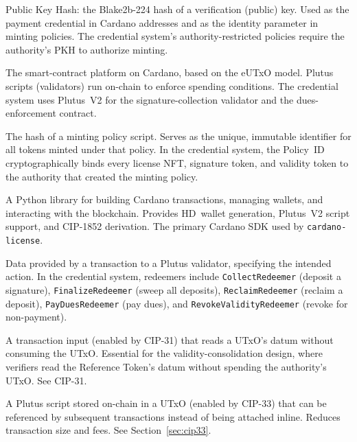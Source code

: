 \begin{description}[style=nextline, leftmargin=2.5cm, labelwidth=2.3cm]
\item[PKH]
  Public Key Hash: the Blake2b-224 hash of a verification (public) key.  Used
  as the payment credential in Cardano addresses and as the identity
  parameter in minting policies.  The credential system's authority-restricted
  policies require the authority's PKH to authorize minting.

\item[Plutus]
  The smart-contract platform on Cardano, based on the eUTxO model.  Plutus
  scripts (validators) run on-chain to enforce spending conditions.  The
  credential system uses Plutus~V2 for the signature-collection validator and
  the dues-enforcement contract.

\item[Policy ID]
  The hash of a minting policy script.  Serves as the unique, immutable
  identifier for all tokens minted under that policy.  In the credential
  system, the Policy~ID cryptographically binds every license NFT,
  signature token, and validity token to the authority that created the
  minting policy.

\item[PyCardano]
  A Python library for building Cardano transactions, managing wallets, and
  interacting with the blockchain.  Provides HD~wallet generation, Plutus~V2
  script support, and CIP-1852 derivation.  The primary Cardano SDK used by
  \texttt{cardano-license}.

\item[Redeemer]
  Data provided by a transaction to a Plutus validator, specifying the
  intended action.  In the credential system, redeemers include
  \texttt{CollectRedeemer} (deposit a signature), \texttt{FinalizeRedeemer}
  (sweep all deposits), \texttt{ReclaimRedeemer} (reclaim a deposit),
  \texttt{PayDuesRedeemer} (pay dues), and \texttt{RevokeValidityRedeemer}
  (revoke for non-payment).

\item[Reference Input]
  A transaction input (enabled by CIP-31) that reads a UTxO's datum without
  consuming the UTxO.  Essential for the validity-consolidation design,
  where verifiers read the Reference Token's datum without spending the
  authority's UTxO.  See CIP-31.

\item[Reference Script]
  A Plutus script stored on-chain in a UTxO (enabled by CIP-33) that can be
  referenced by subsequent transactions instead of being attached inline.
  Reduces transaction size and fees.  See Section~\ref{sec:cip33}.


\end{description}
